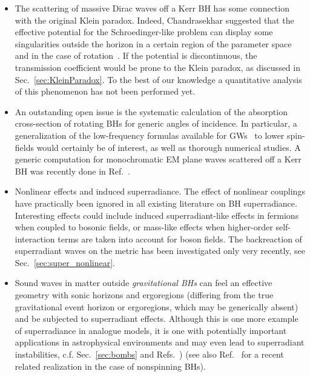 \documentclass[11pt]{article}
\numberwithin{equation}{section} %
\begin{document}
\begin{itemize}
This analysis is over-simplified\footnote{We thank Shahar Hod for drawing our attention to this point.}. In particular, the Bekenstein entropy bound \eqref{Bek_bound} is valid only 
for systems with a fixed radius; in general, there will be charge-dependent corrections. These may be important, as the bound \eqref{aiai} predicts that $Z_m \to 0$ 
when $\omega\to0$, in conflict with Fig.~\ref{fig:SR_charged} (see, in particular, the purple curve). 


\item The scattering of massive Dirac waves off a Kerr BH has some connection with the original Klein paradox. Indeed, Chandrasekhar suggested that the effective potential for the Schroedinger-like problem can display some singularities outside the horizon in a certain region of the parameter space and in the case of rotation~\cite{Chandra}. If the potential is discontinuous, the transmission coefficient would be prone to the Klein paradox, as discussed in Sec.~\ref{sec:KleinParadox}. To the best of our knowledge a quantitative analysis of this phenomenon has not been performed yet. 

\item An outstanding open issue is the systematic calculation of the absorption cross-section of rotating BHs
for generic angles of incidence. In particular, a generalization of the low-frequency formulas available for 
GWs~\cite{Dolan:2008kf} to lower spin-fields would certainly be of interest, as well as thorough numerical studies. 
A generic computation for monochromatic EM plane waves scattered off a Kerr BH was recently done in 
Ref.~\cite{Leite:2018mon}.

\item Nonlinear effects and induced superradiance. The effect of nonlinear couplings have practically been ignored in all existing literature
on BH superradiance. Interesting effects could include induced superradiant-like effects in fermions when coupled to bosonic fields,
or mass-like effects when higher-order self-interaction terms are taken into account for boson fields. The backreaction of superradiant waves on the metric has been investigated only very recently, see Sec.~\ref{sec:super_nonlinear}.

\item Sound waves in matter outside {\it gravitational BHs} can feel an effective geometry with sonic horizons and ergoregions (differing from the true gravitational event horizon or ergoregions, which may be generically absent) and be subjected to superradiant effects. Although this is one more example of superradiance in analogue models, it is one with potentially important applications in astrophysical environments and may even lead to superradiant instabilities, c.f. Sec.~\ref{sec:bombs} and Refs.~\cite{Das:2004wf,Das:2006an}) (see also Ref.~\cite{Chaverra:2015aya} for a recent related realization in the case of nonspinning BHs).


\end{itemize}
\end{document}
